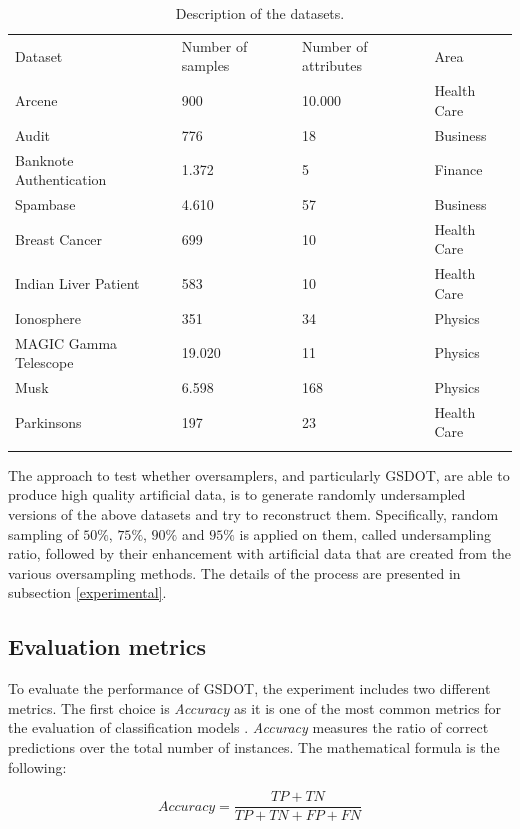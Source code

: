\begin{table}
  \centering
  \caption{\label{tab:datasets}Description of the datasets.}
  \label{tab:description}
  \begin{tabular}{llll}
  \hline\noalign{\smallskip}
  Dataset & Number of samples & Number of attributes & Area \\
  \noalign{\smallskip}\hline\noalign{\smallskip}
  Arcene & 900 & 10.000 & Health Care \\
	Audit & 776 & 18 & Business \\
	Banknote Authentication & 1.372 & 5 & Finance \\
	Spambase & 4.610 & 57 & Business\\
	Breast Cancer & 699 & 10 & Health Care\\
	Indian Liver Patient & 583 & 10 & Health Care\\
	Ionosphere & 351 & 34 & Physics\\
	MAGIC Gamma Telescope & 19.020 & 11 & Physics\\
	Musk & 6.598 & 168 & Physics\\
	Parkinsons & 197 & 23 & Health Care\\
  \noalign{\smallskip}\hline
  \end{tabular}
\end{table}

The approach to test whether oversamplers, and particularly GSDOT, are able to produce high quality artificial data, is to generate randomly undersampled versions of the above datasets and try to reconstruct them. Specifically, random sampling of $50\%$, $75\%$, $90\%$ and $95\%$ is applied on them, called undersampling ratio, followed by their enhancement with artificial data that are created from the various oversampling methods. The details of the process are presented in subsection \ref{experimental}.

\subsection{Evaluation metrics}

To evaluate the performance of GSDOT, the experiment includes two different metrics. The first choice is \textit{Accuracy} as it is one of the most common metrics for the evaluation of classification models \cite{M.2015}. \textit{Accuracy} measures the ratio of correct predictions over the total number of instances. The mathematical formula is the following:

$$ \textit{Accuracy} = \frac{TP + TN}{TP +TN + FP + FN}$$

